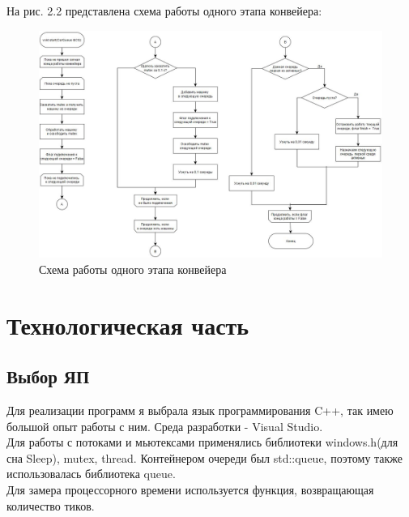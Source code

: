 \documentclass[12pt]{report}
\begin{document}
На рис. 2.2 представлена схема работы одного этапа конвейера:
	\begin{figure}[h]
        	\begin{center}
        		\includegraphics[scale=0.63]{2_1}
        		\caption{Схема работы одного этапа конвейера}
        		\label{fig:def}
        	\end{center}
        \end{figure}


\chapter{Технологическая часть}
\section{Выбор ЯП}
Для реализации программ я выбрала язык программирования C++, так имею большой опыт работы с ним. Среда разработки - Visual Studio. \\

Для работы с потоками и мьютексами применялись библиотеки windows.h(для сна Sleep), mutex, thread. Контейнером очереди был std::queue, поэтому также использовалась библиотека queue. \\

Для замера процессорного времени используется функция, возвращающая количество тиков.\\
\end{document}
